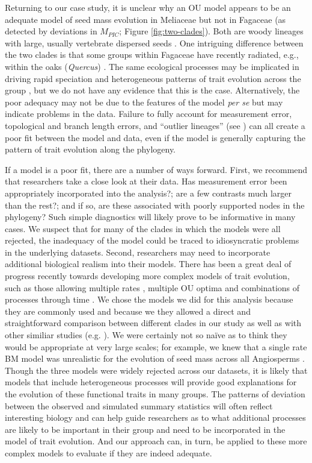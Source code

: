 \documentclass[a4paper,12pt]{article}
\begin{document}
Returning to our case study, it is unclear why an OU model appears to be an adequate model of seed mass evolution in Meliaceae but not in Fagaceae (as detected by deviations in $M_{PIC}$; Figure \ref{fig:two-clades}).  
Both are woody lineages with large, usually vertebrate dispersed seeds \citep{Pannell1987, Manos2001}. One intriguing difference between the two clades is that some groups within Fagaceae have recently radiated, e.g., within the oaks (\emph{Quercus}) \citep{Simeone2013}. The same ecological processes may be implicated in driving rapid speciation and heterogeneous patterns of trait evolution across the group \citep{Schluter2000}, but we do not have any evidence that this is the case. Alternatively, the poor adequacy may not be due to the features of the model \emph{per se} but may indicate problems in the data. Failure to fully account for measurement error, topological and branch length errors, and ``outlier lineages'' (see \citep{SlaterPennell}) can all create a poor fit between the model and data, even if the model is generally capturing the pattern of trait evolution along the phylogeny.

If a model is a poor fit, there are a number of ways forward. First, we recommend that researchers take a close look at their data. Has measurement error been appropriately incorporated into the analysis?; are a few contrasts much larger than the rest?; and if so, are these associated with poorly supported nodes in the phylogeny? Such simple diagnostics will likely prove to be informative in many cases. We suspect that for many of the clades in which the models were all rejected, the inadequacy of the model could be traced to idiosyncratic problems in the underlying datasets. Second, researchers may need to incorporate additional biological realism into their models. There has been a great deal of progress recently towards developing more complex models of trait evolution, such as those allowing multiple rates \citep{Omeara2006, Eastman2011}, multiple OU optima \citep{ButlerKing2004, Beaulieu2012, IngramMahler, UyedaBayou} and combinations of processes through time \citep{SlaterMEE}. We chose the models we did for this analysis because they are commonly used and because we they allowed a direct and straightforward comparison between different clades in our study as well as with other similiar studies (e.g. \citep{Harmon2010}). We were certainly not so na\"{i}ve as to think they would be appropriate at very large scales; for example, we knew that a single rate BM model was unrealistic for the evolution of seed mass across all Angiosperms \citep{Moles2005}. Though the three models were widely rejected across our datasets, it is likely that models that include heterogeneous processes will provide good explanations for the evolution of these functional traits in many groups.  The patterns of deviation between the observed and simulated summary statistics will often reflect interesting biology and can help guide researchers as to what additional processes are likely to be important in their group and need to be incorporated in the model of trait evolution. And our approach can, in turn, be applied to these more complex models to evaluate if they are indeed adequate. 
\end{document}
